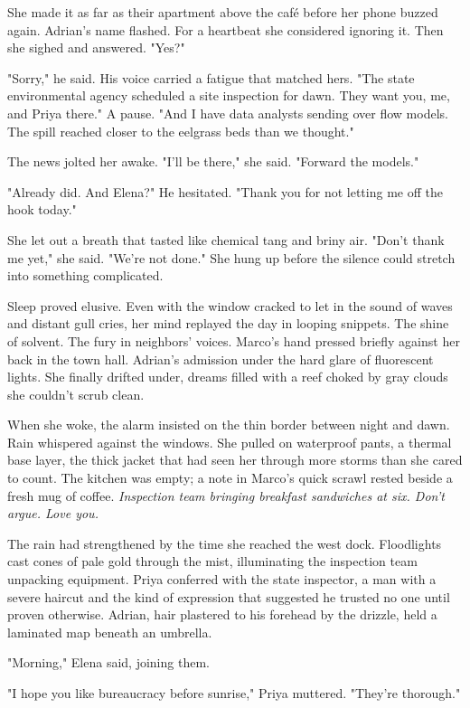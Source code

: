 She made it as far as their apartment above the café before her phone buzzed again. Adrian's name flashed. For a heartbeat she considered ignoring it. Then she sighed and answered. "Yes?"

"Sorry," he said. His voice carried a fatigue that matched hers. "The state environmental agency scheduled a site inspection for dawn. They want you, me, and Priya there." A pause. "And I have data analysts sending over flow models. The spill reached closer to the eelgrass beds than we thought."

The news jolted her awake. "I'll be there," she said. "Forward the models."

"Already did. And Elena?" He hesitated. "Thank you for not letting me off the hook today."

She let out a breath that tasted like chemical tang and briny air. "Don't thank me yet," she said. "We're not done." She hung up before the silence could stretch into something complicated.

Sleep proved elusive. Even with the window cracked to let in the sound of waves and distant gull cries, her mind replayed the day in looping snippets. The shine of solvent. The fury in neighbors' voices. Marco's hand pressed briefly against her back in the town hall. Adrian's admission under the hard glare of fluorescent lights. She finally drifted under, dreams filled with a reef choked by gray clouds she couldn't scrub clean.

When she woke, the alarm insisted on the thin border between night and dawn. Rain whispered against the windows. She pulled on waterproof pants, a thermal base layer, the thick jacket that had seen her through more storms than she cared to count. The kitchen was empty; a note in Marco's quick scrawl rested beside a fresh mug of coffee. \textit{Inspection team bringing breakfast sandwiches at six. Don't argue. Love you.}

The rain had strengthened by the time she reached the west dock. Floodlights cast cones of pale gold through the mist, illuminating the inspection team unpacking equipment. Priya conferred with the state inspector, a man with a severe haircut and the kind of expression that suggested he trusted no one until proven otherwise. Adrian, hair plastered to his forehead by the drizzle, held a laminated map beneath an umbrella.

"Morning," Elena said, joining them.

"I hope you like bureaucracy before sunrise," Priya muttered. "They're thorough."

